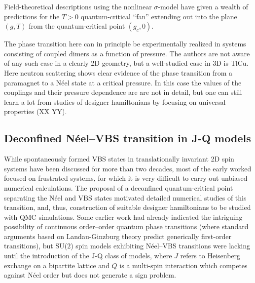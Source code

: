 \documentclass[range]{ar2e}
\begin{document}
Field-theoretical descriptions using the nonlinear $\sigma$-model \cite{Haldane83,Chakravarty89} have given a wealth of predictions \cite{Chubukov94}
for the $T>0$ quantum-critical ``fan'' extending out into the plane $(g,T)$  from the quantum-critical point $(g_c,0)$. 

The phase transition here can in principle be experimentally realized in systems consisting of coupled dimers as a function of pressure. The authors 
are not aware of any such case in a clearly 2D geometry, but a well-studied case in 3D is TlCu. Here neutron scattering shows clear evidence of the 
phase transition from a paramagnet to a N\'eel state at a critical pressure. In this case the values of the couplings and their pressure dependence
are are not in detail, but one can still learn a lot from studies of designer hamiltonians by focusing on universal properties (XX YY).

\subsection{Deconfined N\'eel--VBS transition in J-Q models}

While spontaneously formed VBS states in translationally invariant 2D spin systems have been discussed for more than two decades,\cite{Chandra88,Dagotto89,Read89}
most of the early worked focused on frustrated systems, for which it is very difficult to carry out unbiased numerical calculations. The proposal of a deconfined 
quantum-critical point separating the N\'eel and VBS states motivated detailed numerical studies of this transition, and, thus, construction of suitable designer 
hamiltonians to be studied with QMC simulations. Some earlier work had already indicated the intriguing possibility of continuous order--order quantum phase 
transitions (where
standard arguments based on Landau-Ginzburg theory predict generically first-order transitions), but SU($2$) spin models exhibiting N\'eel--VBS 
transitions were lacking until the introduction of the J-Q class of models, where $J$ refers to Heisenberg exchange on a bipartite lattice
and $Q$ is a multi-spin interaction which competes against N\'eel order but does not generate a sign problem.
\end{document}
